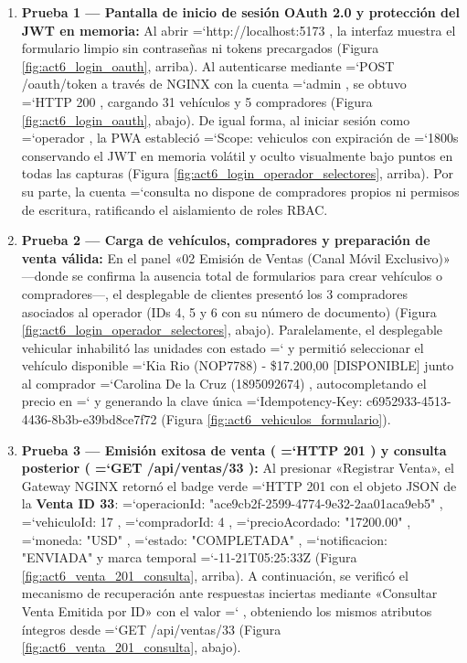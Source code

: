 \documentclass[11pt,a4paper]{article}
\renewcommand{\_}{\oldunderscore\allowbreak}
\DeclareRobustCommand{\texttt}[1]{%
  {\upshape\ttfamily\fontsize{9}{10.8}\selectfont\hyphenchar\font=`\-\relax #1}%
}
\begin{document}
\begin{enumerate}[leftmargin=*,itemsep=3pt,topsep=2pt]
  \item \textbf{Prueba 1 — Pantalla de inicio de sesión OAuth 2.0 y protección del JWT en memoria:} Al abrir \texttt{http:\allowbreak{}/\allowbreak{}/\allowbreak{}localhost:\allowbreak{}5173}, la interfaz muestra el formulario limpio sin contraseñas ni tokens precargados (Figura \ref{fig:act6_login_oauth}, arriba). Al autenticarse mediante \texttt{POST /\allowbreak{}oauth/\allowbreak{}token} a través de NGINX con la cuenta \texttt{admin}, se obtuvo \texttt{HTTP 200}, cargando 31 vehículos y 5 compradores (Figura \ref{fig:act6_login_oauth}, abajo). De igual forma, al iniciar sesión como \texttt{operador}, la PWA estableció \texttt{Scope: vehiculos} con expiración de \texttt{1800s} conservando el JWT en memoria volátil y oculto visualmente bajo puntos en todas las capturas (Figura \ref{fig:act6_login_operador_selectores}, arriba). Por su parte, la cuenta \texttt{consulta} no dispone de compradores propios ni permisos de escritura, ratificando el aislamiento de roles RBAC.
  \item \textbf{Prueba 2 — Carga de vehículos, compradores y preparación de venta válida:} En el panel «02 Emisión de Ventas (Canal Móvil Exclusivo)» —donde se confirma la ausencia total de formularios para crear vehículos o compradores—, el desplegable de clientes presentó los 3 compradores asociados al operador (IDs 4, 5 y 6 con su número de documento) (Figura \ref{fig:act6_login_operador_selectores}, abajo). Paralelamente, el desplegable vehicular inhabilitó las unidades con estado \texttt{[VENDIDO]} y permitió seleccionar el vehículo disponible \texttt{[ID 17] Kia Rio (NOP7788) - \$17.\allowbreak{}200,\allowbreak{}00 [DISPONIBLE]} junto al comprador \texttt{[ID 4] Carolina De la Cruz (1895092674)}, autocompletando el precio en \texttt{17200} y generando la clave única \texttt{Idempotency-Key: c6952933-4513-4436-8b3b-e39bd8ce7f72} (Figura \ref{fig:act6_vehiculos_formulario}).
  \item \textbf{Prueba 3 — Emisión exitosa de venta (\texttt{HTTP 201}) y consulta posterior (\texttt{GET /\allowbreak{}api/\allowbreak{}ventas/\allowbreak{}33}):} Al presionar «Registrar Venta», el Gateway NGINX retornó el badge verde \texttt{HTTP 201} con el objeto JSON de la \textbf{Venta ID 33}: \texttt{operacionId: "ace9cb2f-2599-4774-9e32-2aa01aca9eb5"}, \texttt{vehiculoId: 17}, \texttt{compradorId: 4}, \texttt{precioAcordado: "17200.\allowbreak{}00"}, \texttt{moneda: "USD"}, \texttt{estado: "COMPLETADA"}, \texttt{notificacion: "ENVIADA"} y marca temporal \texttt{2026-11-21T05:\allowbreak{}25:\allowbreak{}33Z} (Figura \ref{fig:act6_venta_201_consulta}, arriba). A continuación, se verificó el mecanismo de recuperación ante respuestas inciertas mediante «Consultar Venta Emitida por ID» con el valor \texttt{33}, obteniendo los mismos atributos íntegros desde \texttt{GET /\allowbreak{}api/\allowbreak{}ventas/\allowbreak{}33} (Figura \ref{fig:act6_venta_201_consulta}, abajo).

\end{enumerate}
\end{document}

